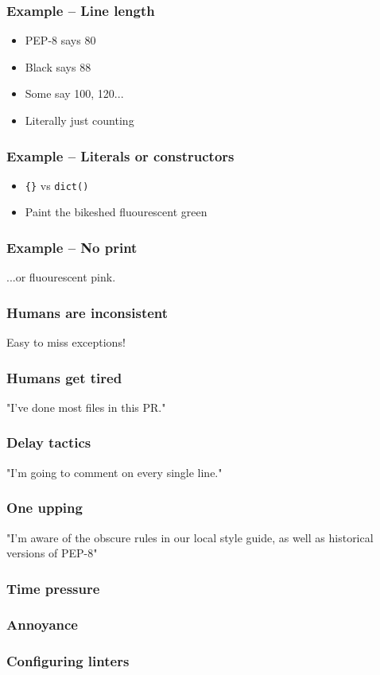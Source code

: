 \begin{frame}
\frametitle{Example -- Line length}
\begin{itemize}
\item PEP-8 says 80
\item Black says 88
\item Some say 100, 120...
\item Literally just counting
\end{itemize}
\end{frame}

\begin{frame}[fragile]
\frametitle{Example -- Literals or constructors}
\begin{itemize}
\item \verb|{}| vs \verb|dict()|
\item Paint the bikeshed fluourescent green
\end{itemize}
\end{frame}

\begin{frame}
\frametitle{Example -- No print}
...or fluourescent pink.
\end{frame}

\begin{frame}
\frametitle{Humans are inconsistent}
Easy to miss exceptions!
\end{frame}

\begin{frame}
\frametitle{Humans get tired}
"I've done most files in this PR."
\end{frame}

\begin{frame}
\frametitle{Delay tactics}
"I'm going to comment on every single line."
\end{frame}

\begin{frame}
\frametitle{One upping}
"I'm aware of the obscure rules in our local style guide,
as well as historical versions of PEP-8"
\end{frame}

\begin{frame}
\frametitle{Time pressure}
\end{frame}

\begin{frame}
\frametitle{Annoyance}
\end{frame}

\begin{frame}
\frametitle{Configuring linters}
\end{frame}

